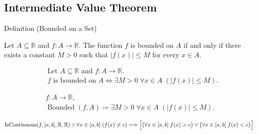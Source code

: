 
\subsection*{Intermediate Value Theorem}
\label{sec:ivt}

\begin{definitionbox}{Definition (Bounded on a Set)}
\begin{definition}
\label{def:bounded-on-a-set}
Let $A \subseteq \mathbb{R}$ and $f \colon A \to \mathbb{R}$. The function $f$ is bounded on $A$ if and only if there exists a constant $M>0$ such that $|f(x)| \le M$ for every $x \in A$.
\end{definition}
\end{definitionbox}

\begin{remark*}
\[
\begin{aligned}
&\text{Let } A \subseteq \mathbb{R} \text{ and } f \colon A \to \mathbb{R}.\\
&f \text{ is bounded on } A
\Longleftrightarrow
\exists M>0 \; \forall x \in A \; (|f(x)| \le M).
\end{aligned}
\]
\end{remark*}

\begin{remark*}
\[
\begin{aligned}
  f\colon A\to\mathbb{R},\\
\operatorname{Bounded}(f,A) \coloneqq \exists M>0 \; \forall x \in A \; (|f(x)| \le M).
\end{aligned}
\]


\[
\operatorname{IsContinuous}(f,[a,b],\mathbb{R},\mathbb{R})
\land \forall x\in[a,b]\;(f(x)\neq c)
\Longrightarrow
\Bigl[\bigl(\forall x\in[a,b]\; f(x)>c\bigr)
\lor
\bigl(\forall x\in[a,b]\; f(x)<c\bigr)\Bigr].
\]
\end{remark*}

